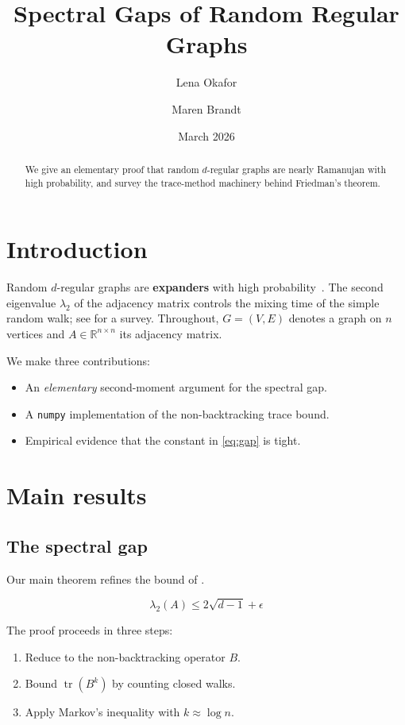 \documentclass[11pt,a4paper]{article}
\title{Spectral Gaps of Random Regular Graphs}
\author{Lena Okafor \and Maren Brandt}
\date{March 2026}
\newcommand{\keyword}[1]{\textbf{#1}}
\newcommand{\Reals}{\mathbb{R}}
\begin{document}
\maketitle

\begin{abstract}
We give an elementary proof that random $d$-regular graphs are nearly
Ramanujan with high probability, and survey the trace-method machinery
behind Friedman's theorem.
\end{abstract}

\section{Introduction}
\label{sec:intro}

Random $d$-regular graphs are \keyword{expanders} with high
probability~\cite{friedman2008}. The second eigenvalue $\lambda_2$ of the
adjacency matrix controls the mixing time of the simple random walk; see
\cite{hoory2006} for a survey. Throughout, $G = (V, E)$ denotes a graph on
$n$ vertices and $A \in \Reals^{n \times n}$ its adjacency matrix.

We make three contributions:
\begin{itemize}
  \item An \emph{elementary} second-moment argument for the spectral gap.
  \item A \texttt{numpy} implementation of the non-backtracking trace bound.
  \item Empirical evidence that the constant in \eqref{eq:gap} is tight.
\end{itemize}

\section{Main results}
\label{sec:results}

\subsection{The spectral gap}

Our main theorem refines the bound of \cite{friedman2008}.

\begin{equation}
  \label{eq:gap}
  \lambda_2(A) \le 2\sqrt{d-1} + \epsilon
\end{equation}

The proof proceeds in three steps:
\begin{enumerate}
  \item Reduce to the non-backtracking operator $B$.
  \item Bound $\operatorname{tr}(B^k)$ by counting closed walks.
  \item Apply Markov's inequality with $k \approx \log n$.
\end{enumerate}
\end{document}
